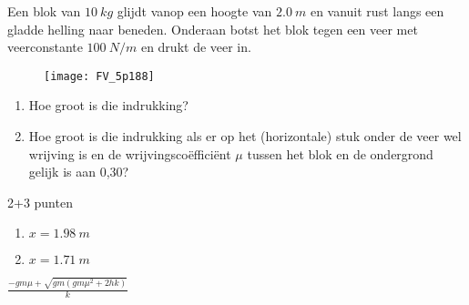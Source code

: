
\begin{exercise}




Een blok van $\SI{10}{kg}$ glijdt vanop een hoogte van $\SI{2,0}{m}$ en vanuit rust langs een gladde helling naar beneden. Onderaan botst het blok tegen een veer met veerconstante $\SI{100}{N/m}$ en drukt de veer in.
\begin{figure}[h]
\centering
\texttt{[image: FV\_5p188]}
\end{figure}
\begin{enumerate}
\item Hoe groot is die indrukking?
\item Hoe groot is die indrukking als er op het (horizontale) stuk onder de veer wel wrijving is en de wrijvingsco\"effici\"ent $\mu$ tussen het blok en de ondergrond gelijk is aan 0,30?
\end{enumerate}

\begin{oplossing}
2+3 punten

\begin{enumerate}
	\item $x=\SI{1,98}{m}$
	\item $x=\SI{1,71}{m}$
\end{enumerate}
$\displaystyle\frac{- g m \mu + \sqrt{g m \left(g m \mu^{2} + 2 h k\right)}}{k}$
\end{oplossing}

\end{exercise}
